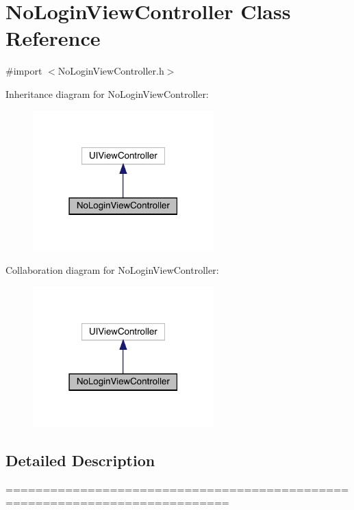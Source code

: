 \hypertarget{interface_no_login_view_controller}{}\section{No\+Login\+View\+Controller Class Reference}
\label{interface_no_login_view_controller}


{\ttfamily \#import $<$No\+Login\+View\+Controller.\+h$>$}



Inheritance diagram for No\+Login\+View\+Controller\+:\nopagebreak
\begin{figure}[H]
\begin{center}
\leavevmode
\includegraphics[width=198pt]{interface_no_login_view_controller__inherit__graph}
\end{center}
\end{figure}


Collaboration diagram for No\+Login\+View\+Controller\+:\nopagebreak
\begin{figure}[H]
\begin{center}
\leavevmode
\includegraphics[width=198pt]{interface_no_login_view_controller__coll__graph}
\end{center}
\end{figure}


\subsection{Detailed Description}
============================================================================

